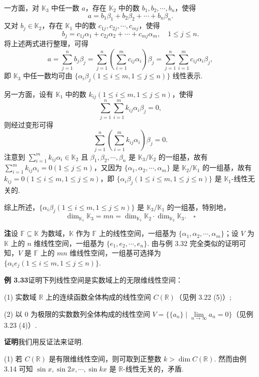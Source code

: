 \documentclass[UTF8, 12pt, fontset=fandol, oneside]{ctexart}
\begin{document}
一方面，对 $\mathbb{K}_3$ 中任一数 $a$，存在 $\mathbb{K}_2$ 中的数 $b_1,b_2,\cdots,b_n$，使得
\[
a=b_1\beta_1+b_2\beta_2+\cdots+b_n\beta_n.
\]
又对 $b_j\in\mathbb{K}_2$，存在 $\mathbb{K}_1$ 中的数 $c_{1j},c_{2j},\cdots,c_{mj}$，使得
\[
b_j=c_{1j}\alpha_1+c_{2j}\alpha_2+\cdots+c_{mj}\alpha_m,\quad 1\le j\le n.
\]
将上述两式进行整理，可得
\[
a=\sum_{j=1}^n b_j\beta_j=\sum_{j=1}^n\left(\sum_{i=1}^m c_{ij}\alpha_i\right)\beta_j
=\sum_{j=1}^n\sum_{i=1}^m c_{ij}\alpha_i\beta_j,
\]
即 $\mathbb{K}_3$ 中任一数均可由 $\{\alpha_i\beta_j(1\le i\le m,1\le j\le n)\}$ 线性表示.

另一方面，设有 $\mathbb{K}_1$ 中的数 $k_{ij}(1\le i\le m,1\le j\le n)$，使得
\[
\sum_{j=1}^n\sum_{i=1}^m k_{ij}\alpha_i\beta_j=0,
\]
则经过变形可得
\[
\sum_{j=1}^n\left(\sum_{i=1}^m k_{ij}\alpha_i\right)\beta_j=0.
\]
注意到 $\sum_{i=1}^m k_{ij}\alpha_i\in\mathbb{K}_2$ 且 $\beta_1,\beta_2,\cdots,\beta_n$ 是 $\mathbb{K}_3/\mathbb{K}_2$ 的一组基，故有 $\sum_{i=1}^m k_{ij}\alpha_i=0(1\le j\le n)$，又因为 $\{\alpha_1,\alpha_2,\cdots,\alpha_m\}$ 是 $\mathbb{K}_2/\mathbb{K}_1$ 的一组基，故有 $k_{ij}=0(1\le i\le m,1\le j\le n)$，即 $\{\alpha_i\beta_j(1\le i\le m,1\le j\le n)\}$ 是 $\mathbb{K}_1$-线性无关的.

综上所述，$\{\alpha_i\beta_j(1\le i\le m,1\le j\le n)\}$ 是 $\mathbb{K}_3/\mathbb{K}_1$ 的一组基，特别地，
\[
\dim_{\mathbb{K}_1}\mathbb{K}_3=mn=\dim_{\mathbb{K}_1}\mathbb{K}_2\cdot\dim_{\mathbb{K}_2}\mathbb{K}_3. \quad \square
\]

\noindent\textbf{注}\quad 设 $\mathbb{F}\subseteq\mathbb{K}$ 为数域，$\mathbb{K}$ 作为 $\mathbb{F}$ 上的线性空间，一组基为 $\{\alpha_1,\alpha_2,\cdots,\alpha_m\}$；设 $V$ 为 $\mathbb{K}$ 上的 $n$ 维线性空间，一组基为 $\{e_1,e_2,\cdots,e_n\}$. 由与例 3.32 完全类似的证明可知，$V$ 是 $\mathbb{F}$ 上的 $mn$ 维线性空间，一组基可选择为 $\{\alpha_i e_j(1\le i\le m,1\le j\le n)\}$.

\noindent\textbf{例 3.33}\quad 证明下列线性空间是实数域上的无限维线性空间：

(1) 实数域 $\mathbb{R}$ 上的连续函数全体构成的线性空间 $C(\mathbb{R})$（见例 3.22 (5)）;

(2) 以 0 为极限的实数数列全体构成的线性空间 $V=\{\{a_n\}\mid \lim\limits_{n\to\infty}a_n=0\}$（见例 3.23 (4)）.

\noindent\textbf{证明}\quad 我们用反证法来证明.

(1) 若 $C(\mathbb{R})$ 是有限维线性空间，则可取到正整数 $k>\dim C(\mathbb{R})$. 然而由例 3.14 可知 $\sin x,\sin 2x,\cdots,\sin kx$ 是 $\mathbb{R}$-线性无关的，矛盾.
\end{document}
